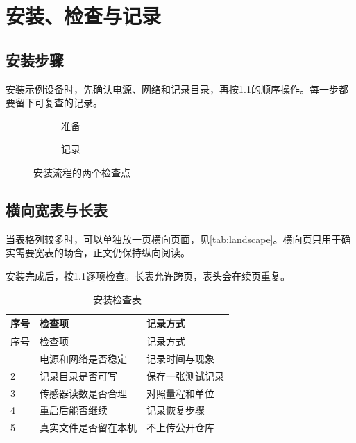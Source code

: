 \chapter{安装、检查与记录}\label{ch:install}

\section{安装步骤}

安装示例设备时，先确认电源、网络和记录目录，再按\cref{fig:install-steps}的顺序操作。每一步都要留下可复查的记录。

\begin{figure}[htbp]
  \centering
  \begin{subfigure}[b]{0.46\linewidth}
    \centering
    \caption{准备}
  \end{subfigure}\hfill
  \begin{subfigure}[b]{0.46\linewidth}
    \centering
    \caption{记录}
  \end{subfigure}
  \caption{安装流程的两个检查点}\label{fig:install-steps}
\end{figure}

\section{横向宽表与长表}

当表格列较多时，可以单独放一页横向页面，见\cref{tab:landscape}。横向页只用于确实需要宽表的场合，正文仍保持纵向阅读。



安装完成后，按\cref{tab:checklist}逐项检查。长表允许跨页，表头会在续页重复。

\begin{longtable}{@{}p{}p{}p{}@{}}
\caption{安装检查表}\label{tab:checklist}\\
\toprule
序号 & 检查项 & 记录方式 \\
\midrule
\endfirsthead
\toprule
序号 & 检查项 & 记录方式 \\
\midrule
\endhead
\bottomrule
\endfoot
1 & 电源和网络是否稳定 & 记录时间与现象 \\
2 & 记录目录是否可写 & 保存一张测试记录 \\
3 & 传感器读数是否合理 & 对照量程和单位 \\
4 & 重启后能否继续 & 记录恢复步骤 \\
5 & 真实文件是否留在本机 & 不上传公开仓库 \\
\end{longtable}

